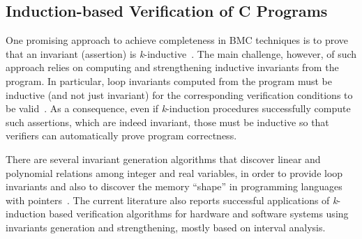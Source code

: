 \documentclass{acm_sen_article}
\begin{document}

\subsection{Induction-based Verification of C Programs}

One promising approach to achieve completeness in BMC techniques is to prove that an invariant (assertion) is \textit{k}-inductive~\cite{EenS03,Sheera00}. The main challenge, however, of such approach relies on computing and strengthening inductive invariants from the program. In particular, loop invariants computed from the program must be inductive (and not just invariant) for the corresponding verification conditions to be valid~\cite{Bradley07}. As a consequence, even if \textit{k}-induction procedures successfully compute such assertions, which are indeed invariant, those must be inductive so that verifiers can automatically prove program correctness.

There are several invariant generation algorithms that discover linear and polynomial relations among integer and real variables, in order to provide loop invariants and also to discover the memory ``shape'' in programming languages with pointers~\cite{pips:2013,Henry:2012}. The current literature also reports successful applications of \textit{k}-induction based verification algorithms for hardware and software systems using invariants generation and strengthening, mostly based on interval analysis. 
\end{document}

